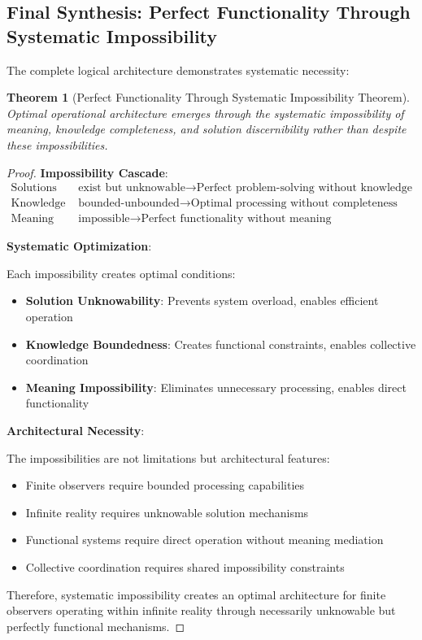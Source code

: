 \documentclass[12pt,a4paper]{article}
\newtheorem{theorem}{Theorem}[section]
\begin{document}
\subsection{Final Synthesis: Perfect Functionality Through Systematic Impossibility}

The complete logical architecture demonstrates systematic necessity:

\begin{theorem}[Perfect Functionality Through Systematic Impossibility Theorem]
Optimal operational architecture emerges through the systematic impossibility of meaning, knowledge completeness, and solution discernibility rather than despite these impossibilities.
\end{theorem}

\begin{proof}
\textbf{Impossibility Cascade}:
\begin{align}
\text{Solutions} &\text{ exist but unknowable} \rightarrow \text{Perfect problem-solving without knowledge} \\
\text{Knowledge} &\text{ bounded-unbounded} \rightarrow \text{Optimal processing without completeness} \\
\text{Meaning} &\text{ impossible} \rightarrow \text{Perfect functionality without meaning}
\end{align}

\textbf{Systematic Optimization}:

Each impossibility creates optimal conditions:
\begin{itemize}
\item \textbf{Solution Unknowability}: Prevents system overload, enables efficient operation
\item \textbf{Knowledge Boundedness}: Creates functional constraints, enables collective coordination
\item \textbf{Meaning Impossibility}: Eliminates unnecessary processing, enables direct functionality
\end{itemize}

\textbf{Architectural Necessity}:

The impossibilities are not limitations but architectural features:
\begin{itemize}
\item Finite observers require bounded processing capabilities
\item Infinite reality requires unknowable solution mechanisms  
\item Functional systems require direct operation without meaning mediation
\item Collective coordination requires shared impossibility constraints
\end{itemize}

Therefore, systematic impossibility creates an optimal architecture for finite observers operating within infinite reality through necessarily unknowable but perfectly functional mechanisms.
\end{proof}
\end{document}
